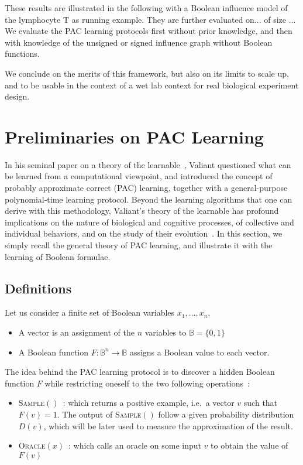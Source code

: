 \documentclass{llncs}
\begin{document}
These results are illustrated in the following with a Boolean influence model of the lymphocyte T as running example.
They are further evaluated on... of size ...
We evaluate the PAC learning protocols first without prior knowledge, and then with knowledge of the unsigned or signed influence graph without Boolean functions.

We conclude on the merits of this framework, but also on its limits to scale up,
and to be usable in the context of a wet lab context for real biological experiment design.


\section{Preliminaries on PAC Learning}\label{pac}

In his seminal paper on a theory of the learnable~\cite{Valiant84cacm},
Valiant questioned what can be learned from a computational viewpoint,
and introduced the concept of probably approximate correct (PAC) learning,
together with a general-purpose polynomial-time learning protocol.
Beyond the learning algorithms that one can derive with this methodology,
Valiant's theory of the learnable has profound implications
on the nature of biological and cognitive processes,
of collective and individual behaviors,
and on the study of their evolution~\cite{Valiant13book}.
In this section, we simply recall the general theory of PAC learning,
and illustrate it with the learning of Boolean formulae.

\subsection{Definitions}

Let us consider a finite set of Boolean variables $x_1,\ldots,x_n$,
\begin{itemize}
	\item A vector is an assignment of the $n$ variables to $\mathbb{B} = \{0,1\}$
	\item A Boolean function $F:{\mathbb{B}}^n \rightarrow \mathbb{B}$
	assigns a Boolean value to each vector.
\end{itemize}

The idea behind the PAC learning protocol is to discover a hidden Boolean function $F$ while restricting oneself to the two following operations~:
\begin{itemize}
  \item
\textsc{Sample}$()$~: which returns a positive example, i.e.~a vector $v$ such that $F(v)=1$. 
The output of \textsc{Sample}$()$ follow a given probability distribution $D(v)$, which will be later used to measure the approximation of the result.
  \item
\textsc{Oracle}$(x)$~: which calls an oracle on some input $v$ to obtain the value of $F(v)$
\end{itemize}
\end{document}
